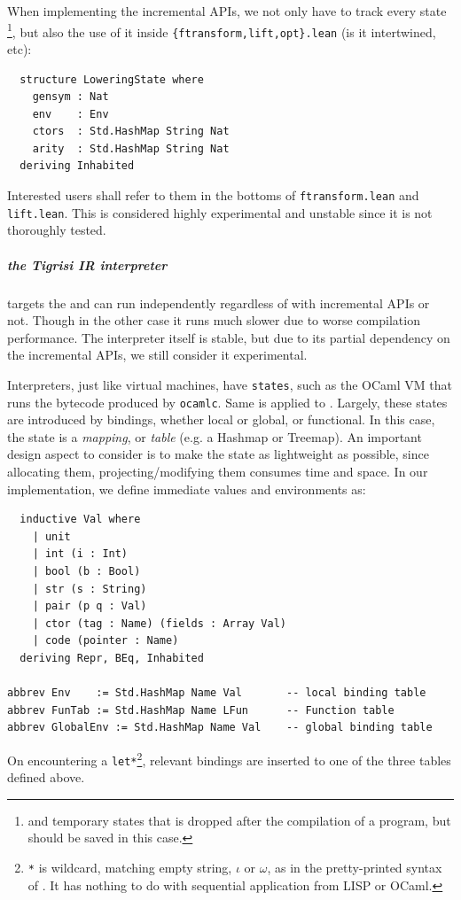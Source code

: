 \documentclass[a4paper, 11pt]{article}
\theoremstyle{remark}\newtheorem*{remark}{Remark}
\theoremstyle{definition}\newtheorem*{definition}{Definition}
\begin{document}
When implementing the incremental APIs, we not only have to track every
state \footnote{and temporary states that is dropped
after the compilation of a program, but should be saved in this case.}, but also
the use of it inside \texttt{\{ftransform,lift,opt\}.lean} (is it intertwined, etc):
\begin{verbatim}
  structure LoweringState where
    gensym : Nat
    env    : Env
    ctors  : Std.HashMap String Nat
    arity  : Std.HashMap String Nat
  deriving Inhabited
\end{verbatim}
Interested users shall refer to them in the bottoms of \texttt{ftransform.lean} and \texttt{lift.lean}. This
is considered highly experimental and unstable since it is not thoroughly tested.

\subparagraph{the \emph{Tigrisi} IR interpreter} targets the \Lambdair and
can run independently regardless of with incremental APIs or not. Though in the other case it runs much slower due to worse compilation performance.
The interpreter itself is stable, but due to its partial dependency on the incremental APIs,
we still consider it experimental.

Interpreters, just like virtual machines, have \texttt{states},
such as the OCaml VM that runs the bytecode produced by \texttt{ocamlc}. Same is applied to \Tigris. Largely,
these states are introduced by bindings, whether local or global, or functional.
In this case, the state is a \emph{mapping}, or \emph{table} (e.g. a Hashmap or Treemap).
An important design aspect to consider is to make the state as lightweight as possible, since allocating them,
projecting/modifying them consumes time and space.
In our implementation, we define immediate values and environments as:

\begin{verbatim}
  inductive Val where
    | unit
    | int (i : Int)
    | bool (b : Bool)
    | str (s : String)
    | pair (p q : Val)
    | ctor (tag : Name) (fields : Array Val)
    | code (pointer : Name)
  deriving Repr, BEq, Inhabited

abbrev Env    := Std.HashMap Name Val       -- local binding table
abbrev FunTab := Std.HashMap Name LFun      -- Function table
abbrev GlobalEnv := Std.HashMap Name Val    -- global binding table
\end{verbatim}

On encountering a \texttt{let*}\footnote{
\texttt{*} is wildcard, matching empty string, $\iota$ or $\omega$, as in the pretty-printed syntax of \Lambdair.
It has nothing to do with sequential application from LISP or OCaml.
}, relevant bindings are inserted to one of the three tables defined above.
\end{document}

